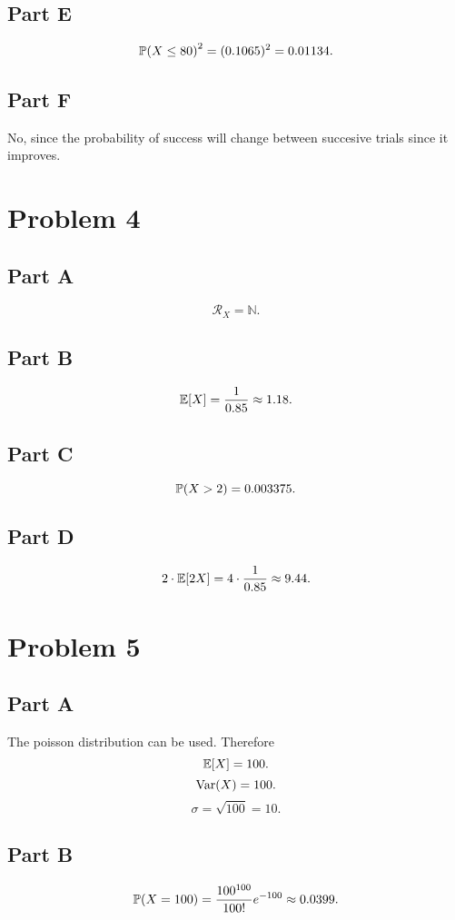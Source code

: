 \documentclass[12pt]{extarticle}
\begin{document}
\subsection*{Part E}
\[
	\mathbb{P}\qty(X \leq 80)^2 = (0.1065)^2 = 0.01134
.\]

\subsection*{Part F}
No, since the probability of success will change between succesive trials since it improves.

\section*{Problem 4}
\subsection*{Part A}
\[
	\mathcal{R}_X = \mathbb{N}
.\]

\subsection*{Part B}
\[
	\mathbb{E}\qty[X] = \frac{1}{0.85} \approx 1.18
.\]

\subsection*{Part C}
\[
	\mathbb{P}\qty(X > 2) = 0.003375
.\]

\subsection*{Part D}
\[
	2\cdot\mathbb{E}\qty[2X] = 4\cdot \frac{1}{0.85} \approx 9.44
.\]

\section*{Problem 5}
\subsection*{Part A}
The poisson distribution can be used. Therefore
\[
	\mathbb{E}\qty[X] = 100
.\]
\[
	\text{Var}\qty(X) = 100
.\]
\[
	\sigma = \sqrt{100} = 10
.\]

\subsection*{Part B}
\[
	\mathbb{P}\qty(X = 100) = \frac{100^{100}}{100!} e^{-100} \approx 0.0399
.\]
\end{document}
